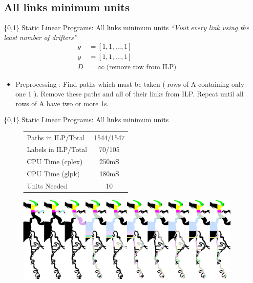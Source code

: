 \documentclass[xcolor=pdflatex,dvipsnames,table]{beamer}
\begin{document}
\subsection{All links minimum units}
\begin{frame}{\{0,1\} Static Linear Programs: All links minimum units}
\emph{``Visit every link using the least number of drifters''}
\begin{align*}
g &= \left[ 1,1, \dots ,1\right]\\
y &= \left[ 1,1, \dots ,1\right]\\
D &= \infty \;\mbox{(remove row from ILP)}
\end{align*}

\begin{itemize}
 \item Preprocessing : Find paths which must be taken ( rows of A containing only one 1 ). Remove these paths and all of their links from ILP. Repeat until all rows of A have two or more 1s.
\end{itemize}
\end{frame}

\begin{frame}{\{0,1\} Static Linear Programs: All links minimum units}
\begin{figure}
  \begin{tabular}{|l|c|}
  \hline 
  Paths in ILP/Total & 1544/1547 \\
  Labels in ILP/Total & 70/105 \\
  CPU Time (cplex) & 250mS\\
  CPU Time (glpk) & 180mS \\
  Units Needed & 10 \\
  \hline
  \end{tabular}
\end{figure}

  \begin{figure}
     {\includegraphics[width=1\textwidth]{figures/all_links_minimum_units_paths.png}}
  \end{figure}
\end{frame}
\end{document}
